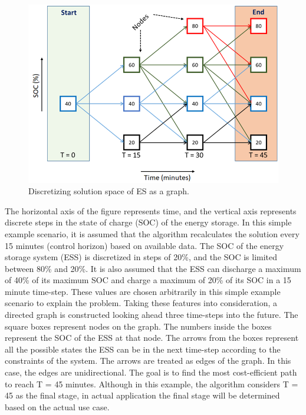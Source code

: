 \begin{figure}[!ht]
    \centering
    \includegraphics[width = \linewidth]{figs/F1_1_Dis.png}
    \caption{Discretizing solution space of ES as a graph.}
    \label{fig:F1_Dis}
\end{figure}

The horizontal axis of the figure represents time, and the vertical axis represents discrete steps in the state of charge (SOC) of the energy storage. In this simple example scenario, it is assumed that the algorithm recalculates the solution every 15 minutes (control horizon) based on available data. The SOC of the energy storage system (ESS) is discretized in steps of 20\%, and the SOC is limited between 80\% and 20\%. It is also assumed that the ESS can discharge a maximum of 40\% of its maximum SOC and charge a maximum of 20\% of its SOC in a 15 minute time-step. These values are chosen arbitrarily in this simple example scenario to explain the problem. Taking these features into consideration, a directed graph is constructed looking ahead three time-steps into the future. The square boxes represent nodes on the graph. The numbers inside the boxes represent the SOC of the ESS at that node. The arrows from the boxes represent all the possible states the ESS can be in the next time-step according to the constraints of the system. The arrows are treated as edges of the graph. In this case, the edges are unidirectional. The goal is to find the most cost-efficient path to reach T = 45 minutes. Although in this example, the algorithm considers T = 45 as the final stage, in actual application the final stage will be determined based on the actual use case.

